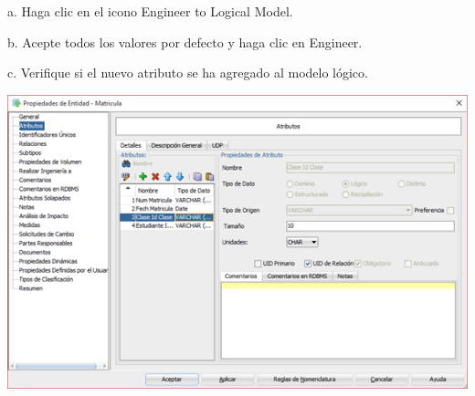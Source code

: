 \documentclass[a4paper,openright,12pt]{book}
\begin{document}
a. Haga clic en el icono Engineer to Logical Model. 

b. Acepte todos los valores por defecto y haga clic en Engineer.
 
c. Verifique si el nuevo atributo se ha agregado al modelo lógico.\\
\begin{center}
\includegraphics[scale=1]{Imag04/6.png} 
\end{center}
\end{document}
